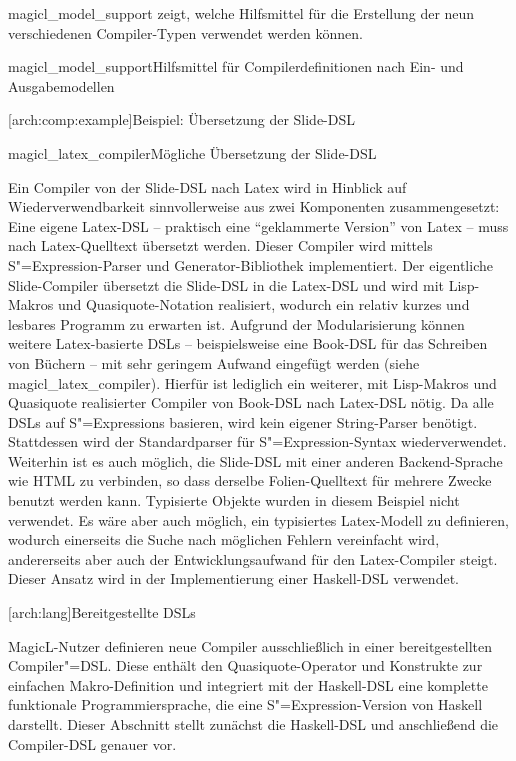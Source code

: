 \documentclass[12pt, a4paper, bibgerm]{scrbook}
\newcommand\lsection{}
\newcommand\lsubsubsection{}
\newcommand\abb{}
\newcommand\fig{}
\newcommand{\seea}[1]{(siehe \abb{#1})}
\newcommand{\sexp}{S"=Expression}
\newcommand{\sexps}{S"=Expressions}
\begin{document}
\medskip{}

\abb{magicl_model_support} zeigt, welche Hilfsmittel für die Erstellung
der neun verschiedenen Compiler-Typen verwendet werden können.

\fig{magicl_model_support}{Hilfsmittel für Compilerdefinitionen nach
  Ein- und Ausgabemodellen}

\lsubsubsection[arch:comp:example]{Beispiel: Übersetzung der Slide-DSL}

\fig{magicl_latex_compiler}{Mögliche Übersetzung der Slide-DSL}

Ein Compiler von der Slide-DSL nach Latex wird in Hinblick auf
Wiederverwendbarkeit sinnvollerweise aus zwei Komponenten
zusammengesetzt: Eine eigene Latex-DSL -- praktisch eine "`geklammerte
Version"' von Latex -- muss nach Latex-Quelltext übersetzt werden.
Dieser Compiler wird mittels \sexp{}-Parser und Generator-Bibliothek
implementiert. Der eigentliche Slide-Compiler übersetzt die Slide-DSL in
die Latex-DSL und wird mit Lisp-Makros und Quasiquote-Notation
realisiert, wodurch ein relativ kurzes und lesbares Programm zu erwarten
ist. Aufgrund der Modularisierung können weitere Latex-basierte DSLs --
beispielsweise eine Book-DSL für das Schreiben von Büchern -- mit sehr
geringem Aufwand eingefügt werden \seea{magicl_latex_compiler}. Hierfür
ist lediglich ein weiterer, mit Lisp-Makros und Quasiquote realisierter
Compiler von Book-DSL nach Latex-DSL nötig. Da alle DSLs auf \sexps{}
basieren, wird kein eigener String-Parser benötigt. Stattdessen wird
der Standardparser für \sexp{}-Syntax wiederverwendet. Weiterhin ist es
auch möglich, die Slide-DSL mit einer anderen Backend-Sprache wie HTML
zu verbinden, so dass derselbe Folien-Quelltext für mehrere
Zwecke benutzt werden kann. Typisierte Objekte wurden in diesem Beispiel
nicht verwendet. Es wäre aber auch möglich, ein typisiertes
Latex-Modell zu definieren, wodurch einerseits die Suche nach möglichen Fehlern
vereinfacht wird, andererseits aber auch der Entwicklungsaufwand für den
Latex-Compiler steigt. Dieser Ansatz wird in der Implementierung
einer Haskell-DSL verwendet.

\lsection[arch:lang]{Bereitgestellte DSLs}

MagicL-Nutzer definieren neue Compiler ausschließlich in einer
bereitgestellten Compiler"=DSL. Diese enthält den Quasiquote-Operator und
Konstrukte zur einfachen Makro-Definition und integriert mit der
Haskell-DSL eine komplette funktionale Programmiersprache, die eine
\sexp{}-Version von Haskell darstellt. Dieser Abschnitt stellt zunächst
die Haskell-DSL und anschließend die Compiler-DSL genauer vor.
\end{document}
